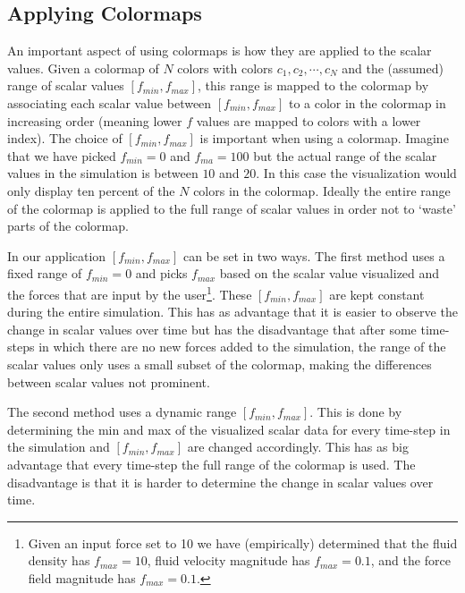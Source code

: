 \subsection{Applying Colormaps}
\label{ss:colormaps:applying}
An important aspect of using colormaps is how they are applied to the scalar values. Given a colormap of $N$ colors with colors $c_1,c_2,\cdots,c_N$ and the (assumed) range of scalar values $[f_{min}, f_{max}]$, this range is mapped to the colormap by associating each scalar value between $[f_{min}, f_{max}]$ to a color in the colormap in increasing order (meaning lower $f$ values are mapped to colors with a lower index). The choice of $[f_{min}, f_{max}]$ is important when using a colormap. Imagine that we have picked $f_{min} = 0$ and $f_{ma} = 100$ but the actual range of the scalar values in the simulation is between $10$ and $20$. In this case the visualization would only display ten percent of the $N$ colors in the colormap. Ideally the entire range of the colormap is applied to the full range of scalar values in order not to `waste' parts of the colormap.

In our application $[f_{min}, f_{max}]$ can be set in two ways. The first method uses a fixed range of $f_{min} = 0$ and picks $f_{max}$ based on the scalar value visualized and the forces that are input by the user\footnote{Given an input force set to 10 we have (empirically) determined that the fluid density has $f_{max} = 10$, fluid velocity magnitude has $f_{max} = 0.1$, and the force field magnitude has $f_{max} = 0.1$.}. These $[f_{min}, f_{max}]$ are kept constant during the entire simulation. This has as advantage that it is easier to observe the change in scalar values over time but has the disadvantage that after some time-steps in which there are no new forces added to the simulation, the range of the scalar values only uses a small subset of the colormap, making the differences between scalar values not prominent.

The second method uses a dynamic range $[f_{min}, f_{max}]$. This is done by determining the min and max of the visualized scalar data for every time-step in the simulation and $[f_{min}, f_{max}]$ are changed accordingly. This has as big advantage that every time-step the full range of the colormap is used. The disadvantage is that it is harder to determine the change in scalar values over time.

